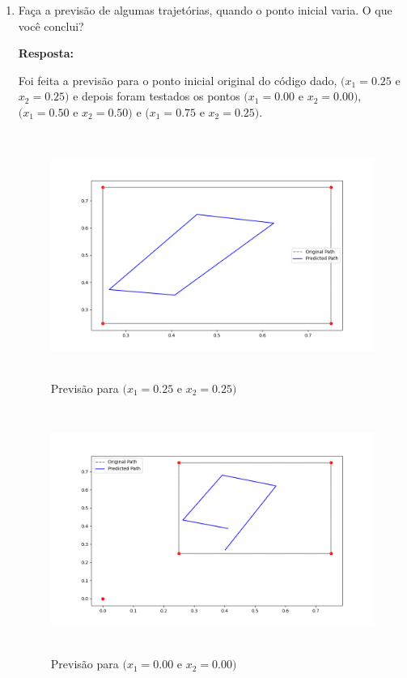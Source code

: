 \documentclass[12 pt]{article}
\begin{document}
\begin{enumerate}
    \item Faça a previsão de algumas trajetórias, quando o ponto inicial varia. O que você conclui?
   
    \textbf{Resposta:} \par

    Foi feita a previsão para o ponto inicial original do código dado, $(x_1=0.25$ e $x_2=0.25)$ e depois foram testados os pontos $(x_1=0.00$ e $x_2=0.00)$, $(x_1=0.50$ e $x_2=0.50)$ e $(x_1=0.75$ e $x_2=0.25)$.
    \begin{figure}[H]
        \caption{Previsão para $(x_1=0.25$ e $x_2=0.25)$}
           \centering
           \includegraphics[height=8cm]{Item_3_25_25.png}
    \end{figure}
    \begin{figure}[H]
        \caption{Previsão para $(x_1=0.00$ e $x_2=0.00)$}
           \centering
           \includegraphics[height=8cm]{Item_3_00_00.png}
    \end{figure}
    \begin{figure}[H]

\end{figure}
\end{enumerate}
\end{document}
